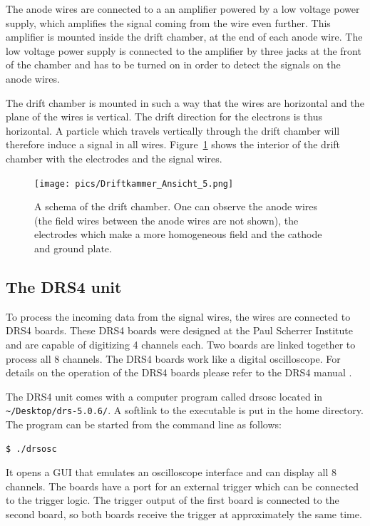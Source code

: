 \documentclass[12pt]{article}
\begin{document}
The anode wires are connected to a an amplifier powered by a low voltage power supply, which amplifies the signal coming from the wire even further. This amplifier is mounted inside the drift chamber, at the end of each anode wire. The low voltage power supply is connected to the amplifier by three jacks at the front of the chamber and has to be turned on in order to detect the signals on the anode wires. 

The drift chamber is mounted in such a way that the wires are horizontal and the plane of the wires is vertical. The drift direction for the electrons is thus horizontal. A particle which travels vertically through the drift chamber will therefore induce a signal in all wires. Figure~\ref{fig:CAD} shows the interior of the drift chamber with the electrodes and the signal wires. 

\begin{figure}[h]
\texttt{[image: pics/Driftkammer\_Ansicht\_5.png]}
\centering
\caption{A schema of the drift chamber. One can observe the anode wires (the field wires between the anode wires are not shown), the electrodes which make a more homogeneous field and the cathode and ground plate.}
\label{fig:CAD}
\end{figure}

\subsection{The DRS4 unit}
To process the incoming data from the signal wires, the wires are connected to DRS4 boards. These DRS4 boards were designed at the Paul Scherrer Institute and are capable of digitizing 4 channels each. Two boards are linked together to process all 8 channels. The DRS4 boards work like a digital oscilloscope. For details on the operation of the DRS4 boards please refer to the DRS4 manual \cite{DRS4_manual}.

The DRS4 unit comes with a computer program called drsosc located in \verb|~/Desktop/drs-5.0.6/|. A softlink to the executable is put in the home directory. The program can be started from the command line as follows: 

\begin{lstlisting}[language=bash]
$ ./drsosc
\end{lstlisting}

 It opens a GUI that emulates an oscilloscope interface and can display all 8 channels. The boards have a port for an external trigger which can be connected to the trigger logic. The trigger output of the first board is connected to the second board, so both boards receive the trigger at approximately the same time.
\end{document}
